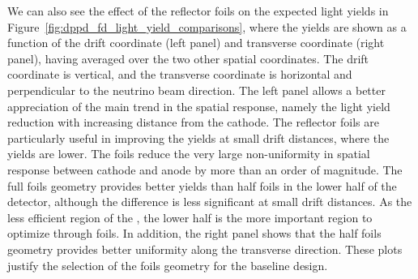 We can also see the effect of the  reflector foils on the expected light yields in Figure~\ref{fig:dppd_fd_light_yield_comparisons}, where the yields are shown as a function of the drift coordinate (left panel) and transverse coordinate (right panel), having averaged over the two other spatial coordinates. The drift coordinate is vertical, and the transverse coordinate is horizontal and perpendicular to the neutrino beam direction. The left panel allows a better appreciation of the main trend in the spatial response, namely the light yield reduction with increasing distance from the cathode. 
The  reflector foils are particularly useful in improving the yields at small drift distances, where the yields are lower. The foils reduce the very large non-uniformity in spatial response between cathode and anode by more than an order of magnitude. The full foils geometry provides better yields than half foils in the lower half of the detector, although the  difference is less significant at small drift distances. As the less efficient region of the , the lower half is the more important region to optimize through foils.   In addition, the right panel shows that the half foils geometry provides better uniformity along the transverse direction. These plots justify the selection of the  foils geometry for the  baseline design. 

